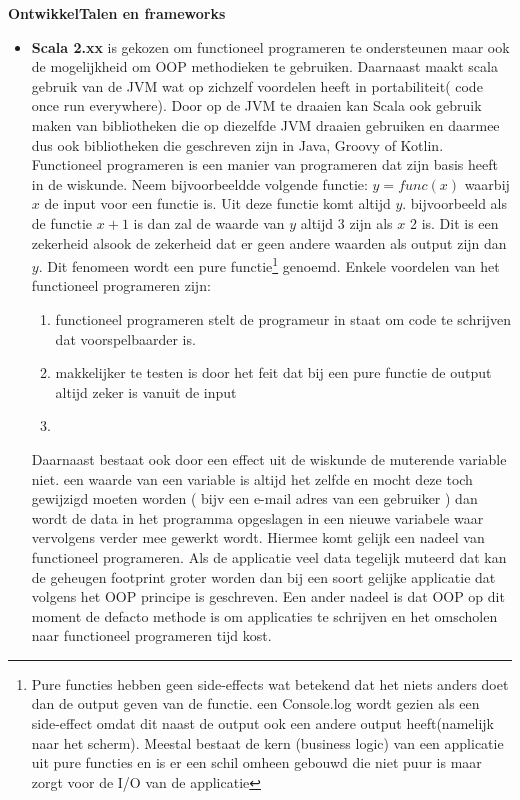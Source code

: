 \textbf{OntwikkelTalen en frameworks}
\begin{itemize}
\item \textbf{Scala 2.xx} is gekozen om functioneel programeren te ondersteunen maar ook de mogelijkheid om OOP methodieken te gebruiken. Daarnaast maakt scala gebruik van de JVM wat op zichzelf voordelen heeft in portabiliteit( code once run everywhere). Door op de JVM te draaien kan Scala ook gebruik maken van bibliotheken die op diezelfde JVM draaien gebruiken en daarmee dus ook bibliotheken die geschreven zijn in Java, Groovy of Kotlin.\\

Functioneel programeren is een manier van programeren dat zijn basis heeft in de wiskunde. Neem bijvoorbeeldde volgende functie: \(y = func(x)\) waarbij \(x\) de input voor een functie is. Uit deze functie komt altijd \(y\). bijvoorbeeld als de functie \(x+1\) is dan zal de waarde van \(y\) altijd 3 zijn als \(x\) 2 is. Dit is een zekerheid alsook de zekerheid dat er geen andere waarden als output zijn dan \(y\). Dit fenomeen wordt een pure functie\footnote{Pure functies hebben geen side-effects wat betekend dat het niets anders doet dan de output geven van de functie. een Console.log wordt gezien als een side-effect omdat dit naast de output ook een andere output heeft(namelijk naar het scherm). Meestal bestaat de kern (business logic) van een applicatie uit pure functies en is er een schil omheen gebouwd die niet puur is maar zorgt voor de I/O van de applicatie} genoemd. Enkele voordelen van het functioneel programeren zijn:
\begin{enumerate}
  \item functioneel programeren stelt de programeur in staat om code te schrijven dat voorspelbaarder is.
  \item makkelijker te testen is door het feit dat bij een pure functie de output altijd zeker is vanuit de input\item
\end{enumerate}
Daarnaast bestaat ook door een effect uit de wiskunde de muterende variable niet. een waarde van een variable is altijd het zelfde en mocht deze toch gewijzigd moeten worden ( bijv een e-mail adres van een gebruiker ) dan wordt de data in het programma opgeslagen in een nieuwe variabele waar vervolgens verder mee gewerkt wordt. Hiermee komt gelijk een nadeel van functioneel programeren. Als de applicatie veel data tegelijk muteerd dat kan de geheugen footprint groter worden dan bij een soort gelijke applicatie dat volgens het OOP principe is geschreven. Een ander nadeel is dat OOP op dit moment de defacto methode is om applicaties te schrijven en het omscholen naar functioneel programeren tijd kost.


\end{itemize}
